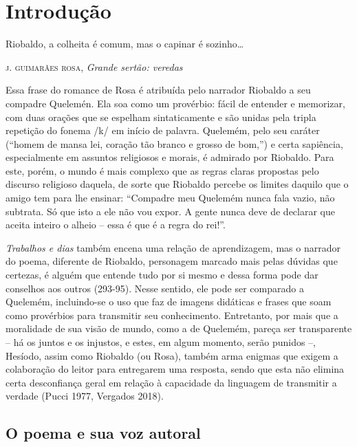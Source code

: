 \chapter{Introdução}

\epigraph{Riobaldo, a colheita é comum,
mas o capinar é sozinho\ldots{}}{\textsc{j. guimarães rosa}, \textit{Grande sertão: veredas}}


Essa frase do romance de Rosa é atribuída pelo narrador Riobaldo a seu
compadre Quelemén. Ela soa como um provérbio: fácil de entender e
memorizar, com duas orações que se espelham sintaticamente e são unidas
pela tripla repetição do fonema /k/ em início de palavra. Quelemém, pelo
seu caráter (``homem de mansa lei, coração tão branco e grosso de
bom,'') e certa sapiência, especialmente em assuntos religiosos e
morais, é admirado por Riobaldo. Para este, porém, o mundo é mais
complexo que as regras claras propostas pelo discurso religioso daquela,
de sorte que Riobaldo percebe os limites daquilo que o amigo tem para
lhe ensinar: ``Compadre meu Quelemém nunca fala vazio, não subtrata. Só
que isto a ele não vou expor. A gente nunca deve de declarar que aceita
inteiro o alheio -- essa é que é a regra do rei!''.

\emph{Trabalhos e dias} também encena uma relação de aprendizagem, mas o
narrador do poema, diferente de Riobaldo, personagem marcado mais pelas
dúvidas que certezas, é alguém que entende tudo por si mesmo e dessa
forma pode dar conselhos aos outros (293-95). Nesse sentido, ele pode
ser comparado a Quelemém, incluindo-se o uso que faz de imagens
didáticas e frases que soam como provérbios para transmitir seu
conhecimento. Entretanto, por mais que a moralidade de sua visão de
mundo, como a de Quelemém, pareça ser transparente -- há os juntos e os
injustos, e estes, em algum momento, serão punidos --, Hesíodo, assim
como Riobaldo (ou Rosa), também arma enigmas que exigem a colaboração do
leitor para entregarem uma resposta, sendo que esta não elimina certa
desconfiança geral em relação à capacidade da linguagem de transmitir a
verdade (Pucci 1977, Vergados 2018).

\section{O poema e sua voz autoral}

